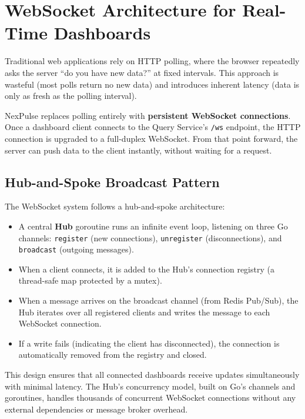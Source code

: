 \documentclass[12pt,a4paper]{article}
\begin{document}
\section{WebSocket Architecture for Real-Time Dashboards}

Traditional web applications rely on HTTP polling, where the browser repeatedly asks the server ``do you have new data?'' at fixed intervals. This approach is wasteful (most polls return no new data) and introduces inherent latency (data is only as fresh as the polling interval).

NexPulse replaces polling entirely with \textbf{persistent WebSocket connections}. Once a dashboard client connects to the Query Service's \texttt{/ws} endpoint, the HTTP connection is upgraded to a full-duplex WebSocket. From that point forward, the server can push data to the client instantly, without waiting for a request.

\subsection{Hub-and-Spoke Broadcast Pattern}

The WebSocket system follows a hub-and-spoke architecture:

\begin{itemize}[leftmargin=2em]
    \item A central \textbf{Hub} goroutine runs an infinite event loop, listening on three Go channels: \texttt{register} (new connections), \texttt{unregister} (disconnections), and \texttt{broadcast} (outgoing messages).
    \item When a client connects, it is added to the Hub's connection registry (a thread-safe map protected by a mutex).
    \item When a message arrives on the broadcast channel (from Redis Pub/Sub), the Hub iterates over all registered clients and writes the message to each WebSocket connection.
    \item If a write fails (indicating the client has disconnected), the connection is automatically removed from the registry and closed.
\end{itemize}

This design ensures that all connected dashboards receive updates simultaneously with minimal latency. The Hub's concurrency model, built on Go's channels and goroutines, handles thousands of concurrent WebSocket connections without any external dependencies or message broker overhead.
\end{document}
